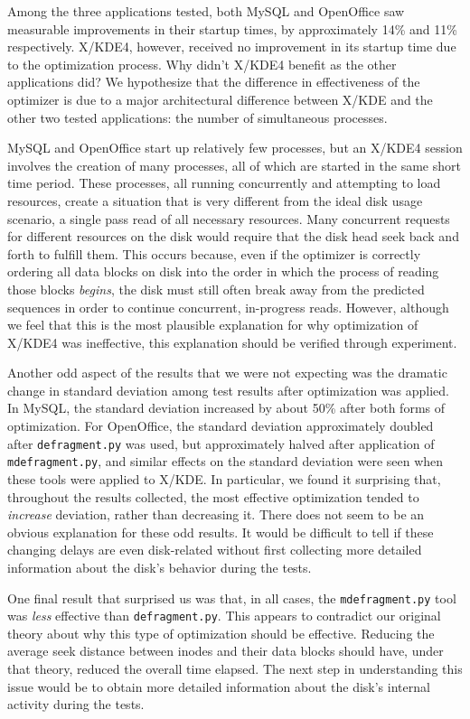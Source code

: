 \documentclass[10pt,twocolumn,letterpaper]{article}
\begin{document}
Among the three applications tested, both MySQL and OpenOffice saw measurable improvements in their startup times, by approximately 14\% and 11\% respectively. X/KDE4, however, received no improvement in its startup time due to the optimization process. Why didn't X/KDE4 benefit as the other applications did? We hypothesize that the difference in effectiveness of the optimizer is due to a major architectural difference between X/KDE and the other two tested applications: the number of simultaneous processes.

MySQL and OpenOffice start up relatively few processes, but an X/KDE4 session involves the creation of many processes, all of which are started in the same short time period. These processes, all running concurrently and attempting to load resources, create a situation that is very different from the ideal disk usage scenario, a single pass read of all necessary resources. Many concurrent requests for different resources on the disk would require that the disk head seek back and forth to fulfill them. This occurs because, even if the optimizer is correctly ordering all data blocks on disk into the order in which the process of reading those blocks \emph{begins}, the disk must still often break away from the predicted sequences in order to continue concurrent, in-progress reads. However, although we feel that this is the most plausible explanation for why optimization of X/KDE4 was ineffective, this explanation should be verified through experiment.

Another odd aspect of the results that we were not expecting was the dramatic change in standard deviation among test results after optimization was applied. In MySQL, the standard deviation increased by about 50\% after both forms of optimization. For OpenOffice, the standard deviation approximately doubled after \texttt{defragment.py} was used, but approximately halved after application of \texttt{mdefragment.py}, and similar effects on the standard deviation were seen when these tools were applied to X/KDE. In particular, we found it surprising that, throughout the results collected, the most effective optimization tended to \emph{increase} deviation, rather than decreasing it. There does not seem to be an obvious explanation for these odd results. It would be difficult to tell if these changing delays are even disk-related without first collecting more detailed information about the disk's behavior during the tests.

One final result that surprised us was that, in all cases, the \texttt{mdefragment.py} tool was \emph{less} effective than \texttt{defragment.py}. This appears to contradict our original theory about why this type of optimization should be effective. Reducing the average seek distance between inodes and their data blocks should have, under that theory, reduced the overall time elapsed. The next step in understanding this issue would be to obtain more detailed information about the disk's internal activity during the tests.
\end{document}

